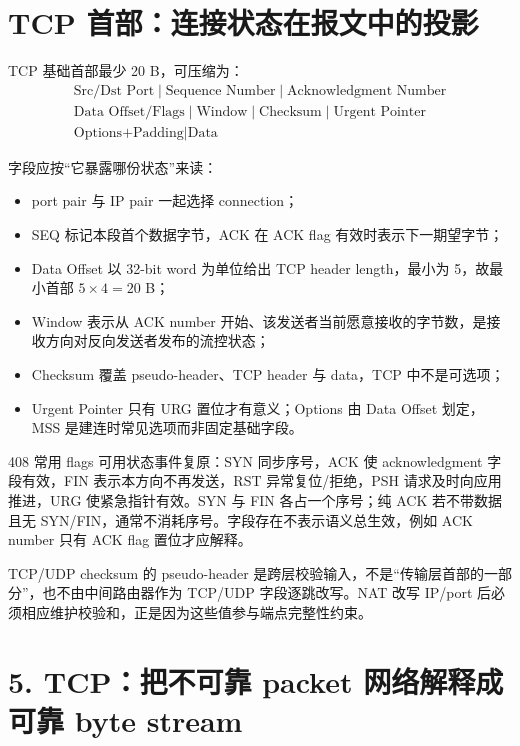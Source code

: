 \documentclass[UTF8,fontset=none,11pt,a4paper]{ctexart}
\providecommand{\tightlist}{\setlength{\itemsep}{0pt}\setlength{\parskip}{0pt}}
\begin{document}
\section{TCP 首部：连接状态在报文中的投影}

TCP 基础首部最少 20 B，可压缩为：
\[
\boxed{\begin{gathered}
\text{Src/Dst Port}\mid\text{Sequence Number}\mid\text{Acknowledgment Number}\\
\text{Data Offset/Flags}\mid\text{Window}\mid\text{Checksum}\mid\text{Urgent Pointer}\\
\text{Options+Padding}\mid\text{Data}
\end{gathered}}
\]

字段应按“它暴露哪份状态”来读：
\begin{itemize}
\tightlist
\item port pair 与 IP pair 一起选择 connection；
\item SEQ 标记本段首个数据字节，ACK 在 ACK flag 有效时表示下一期望字节；
\item Data Offset 以 32-bit word 为单位给出 TCP header length，最小为 5，故最小首部 $5\times4=20$ B；
\item Window 表示从 ACK number 开始、该发送者当前愿意接收的字节数，是接收方向对反向发送者发布的流控状态；
\item Checksum 覆盖 pseudo-header、TCP header 与 data，TCP 中不是可选项；
\item Urgent Pointer 只有 URG 置位才有意义；Options 由 Data Offset 划定，MSS 是建连时常见选项而非固定基础字段。
\end{itemize}

408 常用 flags 可用状态事件复原：SYN 同步序号，ACK 使 acknowledgment 字段有效，FIN 表示本方向不再发送，RST 异常复位/拒绝，PSH 请求及时向应用推进，URG 使紧急指针有效。SYN 与 FIN 各占一个序号；纯 ACK 若不带数据且无 SYN/FIN，通常不消耗序号。字段存在不表示语义总生效，例如 ACK number 只有 ACK flag 置位才应解释。

TCP/UDP checksum 的 pseudo-header 是跨层校验输入，不是“传输层首部的一部分”，也不由中间路由器作为 TCP/UDP 字段逐跳改写。NAT 改写 IP/port 后必须相应维护校验和，正是因为这些值参与端点完整性约束。

\section{5. TCP：把不可靠 packet 网络解释成可靠 byte
stream}\label{4-tcpux628aux4e0dux53efux9760-packet-ux7f51ux7edcux89e3ux91caux6210ux53efux9760-byte-stream}
\end{document}
